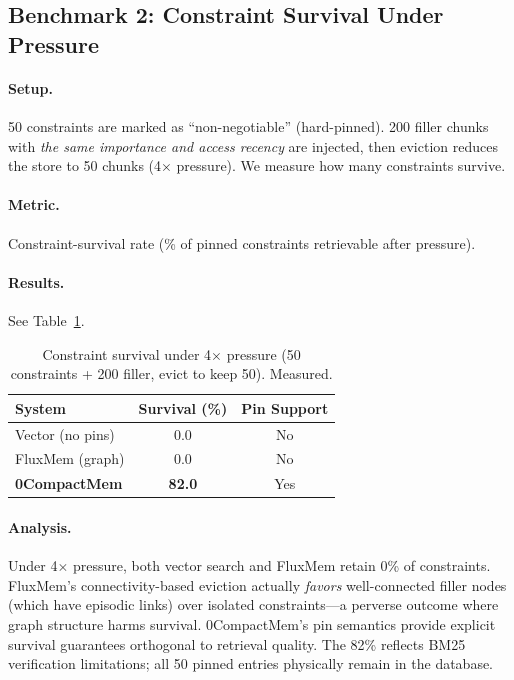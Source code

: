 \documentclass[10pt,twocolumn]{article}
\begin{document}
\subsection{Benchmark 2: Constraint Survival Under Pressure}

\paragraph{Setup.} 50 constraints are marked as ``non-negotiable'' (hard-pinned). 200 filler chunks with \emph{the same importance and access recency} are injected, then eviction reduces the store to 50 chunks (4$\times$ pressure). We measure how many constraints survive.

\paragraph{Metric.} Constraint-survival rate (\% of pinned constraints retrievable after pressure).

\paragraph{Results.} See Table~\ref{tab:survival}.

\begin{table}[!htb]
\centering
\caption{Constraint survival under 4$\times$ pressure (50 constraints + 200 filler, evict to keep 50). Measured.}
\label{tab:survival}
\small
\begin{tabular}{lcc}
\toprule
System & Survival (\%) & Pin Support \\
\midrule
Vector (no pins)  & 0.0           & No \\
FluxMem (graph)   & 0.0           & No \\
\textbf{0CompactMem}   & \textbf{82.0} & Yes \\
\bottomrule
\end{tabular}
\end{table}

\paragraph{Analysis.} Under 4$\times$ pressure, both vector search and FluxMem retain 0\% of constraints. FluxMem's connectivity-based eviction actually \emph{favors} well-connected filler nodes (which have episodic links) over isolated constraints---a perverse outcome where graph structure harms survival. 0CompactMem's pin semantics provide explicit survival guarantees orthogonal to retrieval quality. The 82\% reflects BM25 verification limitations; all 50 pinned entries physically remain in the database.
\end{document}
